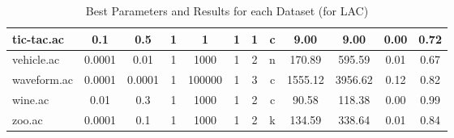 \begin{table}[htbp]
\begin{tabular}{|l|c|c|c|c|c|c|c||c|c|c|c|}
		\hline
		tic-tac.ac     & 0.1      & 0.5         & 1              & 1                   & 1             & 1      & c             & 9.00           & 9.00           & 0.00           & 0.72           \\
		\hline
		vehicle.ac     & 0.0001   & 0.01        & 1              & 1000                & 1             & 2      & n             & 170.89         & 595.59         & 0.01           & 0.67           \\
		\hline
		waveform.ac    & 0.0001   & 0.0001      & 1              & 100000              & 1             & 3      & c             & 1555.12        & 3956.62        & 0.12           & 0.82           \\
		\hline
		wine.ac        & 0.01     & 0.3         & 1              & 1000                & 1             & 2      & c             & 90.58          & 118.38         & 0.00           & 0.99           \\
		\hline
		zoo.ac         & 0.0001   & 0.1         & 1              & 1000                & 1             & 2      & k             & 134.59         & 338.64         & 0.01           & 0.84           \\
		\hline
		\end{tabular}
	\caption{Best Parameters and Results for each Dataset (for LAC)}
	\label{tab:best_runs_for_each_db_lac}
\end{table}
